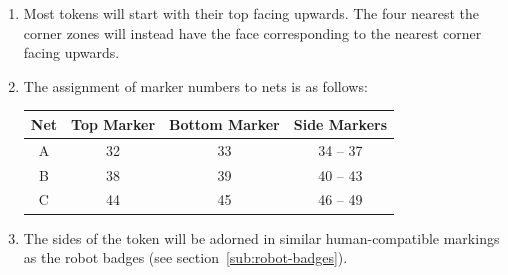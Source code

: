 \begin{enumerate}
\item Most tokens will start with their top facing upwards.
      The four nearest the corner zones will instead have the face corresponding to the nearest corner facing upwards.

\item The assignment of marker numbers to nets is as follows:
\begin{center}
  \begin{tabular}{cccc}
    \toprule
    \textbf{Net} & \textbf{Top Marker} & \textbf{Bottom Marker} & \textbf{Side Markers} \\
    \midrule
    A & 32 & 33 & 34 -- 37 \\
    B & 38 & 39 & 40 -- 43 \\
    C & 44 & 45 & 46 -- 49 \\
    \bottomrule
  \end{tabular}
\end{center}

\item The sides of the token will be adorned in similar human-compatible markings as the robot badges (see section~\ref{sub:robot-badges}).

\end{enumerate}

\clearpage
